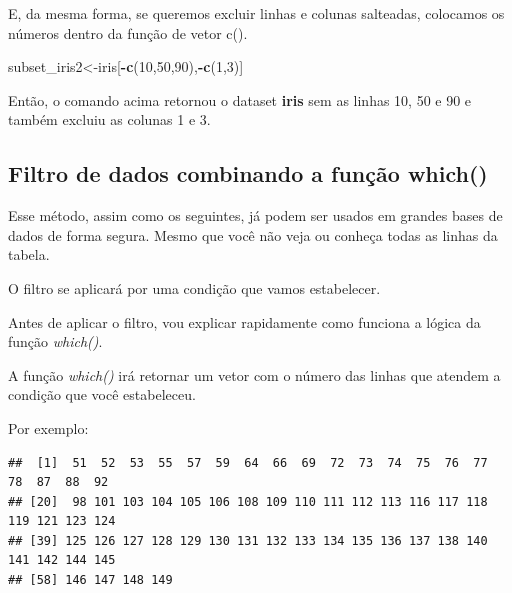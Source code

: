 \documentclass[
]{book}
\newenvironment{Shaded}{\begin{snugshade}}{\end{snugshade}}
\newcommand{\DecValTok}[1]{\textcolor[rgb]{0.00,0.00,0.81}{#1}}
\newcommand{\KeywordTok}[1]{\textcolor[rgb]{0.13,0.29,0.53}{\textbf{#1}}}
\newcommand{\NormalTok}[1]{#1}
\newcommand{\OperatorTok}[1]{\textcolor[rgb]{0.81,0.36,0.00}{\textbf{#1}}}
\begin{document}
E, da mesma forma, se queremos excluir linhas e colunas salteadas,
colocamos os números dentro da função de vetor c().

\begin{Shaded}
\begin{Highlighting}[]
\NormalTok{subset_iris2<-iris[}\OperatorTok{-}\KeywordTok{c}\NormalTok{(}\DecValTok{10}\NormalTok{,}\DecValTok{50}\NormalTok{,}\DecValTok{90}\NormalTok{),}\OperatorTok{-}\KeywordTok{c}\NormalTok{(}\DecValTok{1}\NormalTok{,}\DecValTok{3}\NormalTok{)]}
\end{Highlighting}
\end{Shaded}

Então, o comando acima retornou o dataset \textbf{iris} sem as linhas
10, 50 e 90 e também excluiu as colunas 1 e 3.

\hypertarget{filtro-de-dados-combinando-a-funuxe7uxe3o-which}{%
\subsection{Filtro de dados combinando a função
which()}\label{filtro-de-dados-combinando-a-funuxe7uxe3o-which}}

Esse método, assim como os seguintes, já podem ser usados em grandes
bases de dados de forma segura. Mesmo que você não veja ou conheça todas
as linhas da tabela.

O filtro se aplicará por uma condição que vamos estabelecer.

Antes de aplicar o filtro, vou explicar rapidamente como funciona a
lógica da função \emph{which()}.

A função \emph{which()} irá retornar um vetor com o número das linhas
que atendem a condição que você estabeleceu.

Por exemplo:

\begin{Shaded}
\end{Shaded}

\begin{verbatim}
##  [1]  51  52  53  55  57  59  64  66  69  72  73  74  75  76  77  78  87  88  92
## [20]  98 101 103 104 105 106 108 109 110 111 112 113 116 117 118 119 121 123 124
## [39] 125 126 127 128 129 130 131 132 133 134 135 136 137 138 140 141 142 144 145
## [58] 146 147 148 149
\end{verbatim}
\end{document}
